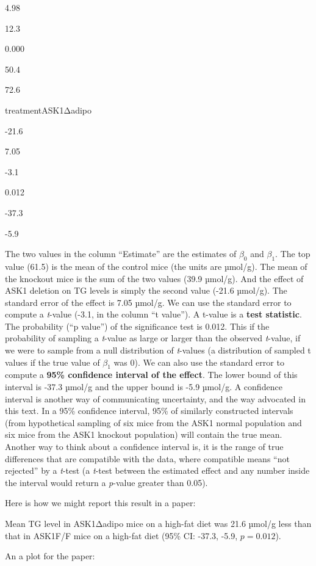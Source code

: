 \documentclass[]{book}
\begin{document}
4.98

12.3

0.000

50.4

72.6

treatmentASK1Δadipo

-21.6

7.05

-3.1

0.012

-37.3

-5.9

The two values in the column ``Estimate'' are the estimates of \(\beta_0\) and \(\beta_1\). The top value (61.5) is the mean of the control mice (the units are µmol/g). The mean of the knockout mice is the sum of the two values (39.9 µmol/g). And the effect of ASK1 deletion on TG levels is simply the second value (-21.6 µmol/g). The standard error of the effect is 7.05 µmol/g. We can use the standard error to compute a \emph{t}-value (-3.1, in the column ``t value''). A t-value is a \textbf{test statistic}. The probability (``p value'') of the significance test is 0.012. This if the probability of sampling a \emph{t}-value as large or larger than the observed \emph{t}-value, if we were to sample from a null distribution of \emph{t}-values (a distribution of sampled t values if the true value of \(\beta_1\) was 0). We can also use the standard error to compute a \textbf{95\% confidence interval of the effect}. The lower bound of this interval is -37.3 µmol/g and the upper bound is -5.9 µmol/g. A confidence interval is another way of communicating uncertainty, and the way advocated in this text. In a 95\% confidence interval, 95\% of similarly constructed intervals (from hypothetical sampling of six mice from the ASK1 normal population and six mice from the ASK1 knockout population) will contain the true mean. Another way to think about a confidence interval is, it is the range of true differences that are compatible with the data, where compatible means ``not rejected'' by a \emph{t}-test (a \emph{t}-test between the estimated effect and any number inside the interval would return a \emph{p}-value greater than 0.05).

Here is how we might report this result in a paper:

Mean TG level in ASK1Δadipo mice on a high-fat diet was 21.6 µmol/g less than that in ASK1F/F mice on a high-fat diet (95\% CI: -37.3, -5.9, \(p = 0.012\)).

An a plot for the paper:
\end{document}
